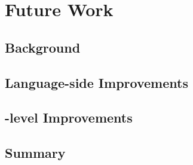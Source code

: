 
\chapter{Future Work}
\minitoc
\introduction

\section{Background}

\section{Language-side Improvements}

\section{\VM-level Improvements}

\section{Summary}

